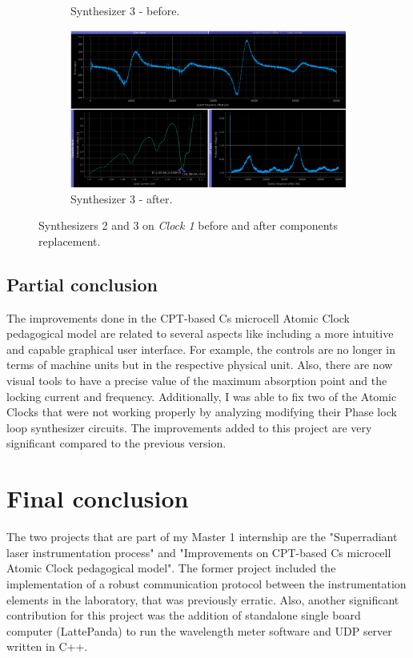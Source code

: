 \documentclass[a4paper,12pt]{article}
\begin{document}
\begin{figure}[!h]
\begin{subfigure}[b]{0.49\textwidth}
\captionsetup{justification=centering}
\caption{Synthesizer 3 - before.}
\end{subfigure}
\hfill
\begin{subfigure}[b]{0.49\textwidth}
\centering
\includegraphics[width=\textwidth]{Images/synth_3_after.png}
\captionsetup{justification=centering}
\caption{Synthesizer 3 - after.}
\end{subfigure}
\caption{Synthesizers 2 and 3 on \textit{Clock 1} before and after components replacement.} 
\label{fig:synth_final}
\end{figure}



\break
\subsection{Partial conclusion}
The improvements done in the CPT-based Cs microcell Atomic Clock pedagogical model are related to several aspects like including a more intuitive and capable graphical user interface. For example, the controls are no longer in terms of machine units but in the respective physical unit. Also, there are now visual tools to have a precise value of the maximum absorption point and the locking current and frequency. Additionally, I was able to fix two of the Atomic Clocks that were not working properly by analyzing modifying their Phase lock loop synthesizer circuits. The improvements added to this project are very significant compared to the previous version. 
\section{Final conclusion}
The two projects that are part of my Master 1 internship are the "Superradiant laser instrumentation process" and "Improvements on CPT-based Cs microcell Atomic Clock
pedagogical model". The former project included the implementation of a robust communication protocol between the instrumentation elements in the laboratory, that was previously erratic. Also, another significant contribution for this project was the addition of standalone single board computer (LattePanda) to run the wavelength meter software and UDP server written in C++. 
\end{document}
